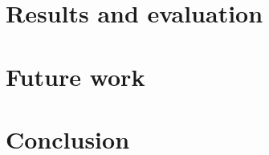 \documentclass{article}
\begin{document}
\section{Results and evaluation}

\section{Future work}
\section{Conclusion}
\end{document}
